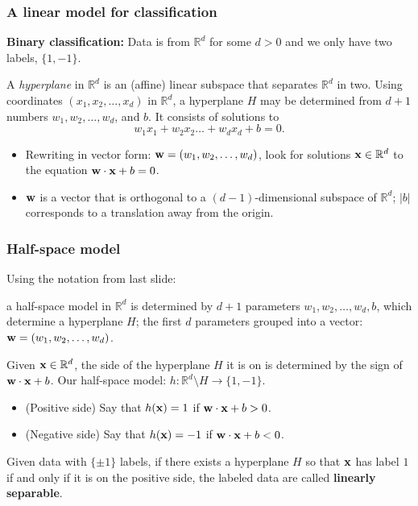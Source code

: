 \documentclass{beamer}
\theoremstyle{example}
\begin{document}
\begin{frame}
    \frametitle{A linear model for classification}
    \textbf{Binary classification:} Data is from $\mathbb R^d$ for some $d>0$ and we only have two labels, $\{1, -1\}$. %
        
        A \emph{hyperplane} in $\mathbb R^d$ is an (affine) linear subspace that separates $\mathbb R^d$ in two. %
        Using coordinates $(x_1,x_2, \ldots, x_d)$ in $\mathbb R^d$, a hyperplane $H$ may be determined from $d+1$ numbers $w_1,w_2,\ldots,w_d$, and $b$. It consists of solutions to 
            \[w_1x_1 + w_2x_2\ldots + w_dx_d + b = 0.\]

    \begin{itemize}
        \item Rewriting in vector form: ${\bf w}=(w_1,w_2,\ldots,w_d)$, look for solutions ${\bf x}\in\mathbb R^d$ to the equation ${\bf w}\cdot{\bf x} + b = 0$.
        \pause
        \item ${\bf w}$ is a vector that is orthogonal to a $(d-1)$-dimensional subspace of $\mathbb R^d$; $|b|$ corresponds to a translation away from the origin.
    \end{itemize}
    \vfill

\end{frame}

\begin{frame}
\frametitle{Half-space model}
    Using the notation from last slide: 
    
    a half-space model in $\mathbb R^d$ is determined by $d+1$ parameters $w_1,w_2,\ldots,w_d,b$, which determine a hyperplane $H$; the first $d$ parameters grouped into a vector: ${\bf w} = (w_1,w_2,\ldots,w_d)$.
    
    \pause
    Given ${\bf x}\in \mathbb R^d$, the side of the hyperplane $H$ it is on is determined by the sign of ${\bf w}\cdot{\bf x} + b$. Our half-space model: $h:\mathbb R^d\setminus H \to \{1,-1\}$.
    \pause
    \begin{itemize}
        \item (Positive side) Say that $h({\bf x}) = 1$ if ${\bf w}\cdot{\bf x}+b > 0$.
        \item (Negative side) Say that $h({\bf x}) = -1$ if ${\bf w}\cdot{\bf x}+b < 0$. 
    \end{itemize}

    \pause
    Given data with $\{\pm1\}$ labels, if there exists a hyperplane $H$ so that ${\bf x}$ has label $1$ if and only if it is on the positive side, the labeled data are called \textbf{linearly separable}. 

\end{frame}
\end{document}
